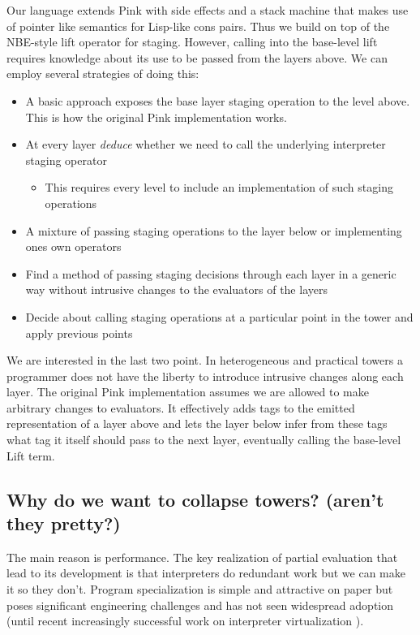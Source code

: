 \documentclass{article}
\begin{document}
Our language extends Pink with side effects and a stack machine that makes use of pointer like semantics for Lisp-like cons pairs. Thus we build on top of the NBE-style lift operator for staging. However, calling into
the base-level lift requires knowledge about its use to be passed from the layers above. We can employ several strategies of doing this:
\begin{itemize}
	\item A basic approach exposes the base layer staging operation to the level above. This is how the original Pink implementation works.
	\item At every layer \textit{deduce} whether we need to call the underlying interpreter staging operator
	\begin{itemize}
		\item This requires every level to include an implementation of such staging operations
	\end{itemize}
	\item A mixture of passing staging operations to the layer below or implementing ones own operators
	\item Find a method of passing staging decisions through each layer in a generic way without intrusive changes to the evaluators of the layers
	\item Decide about calling staging operations at a particular point in the tower and apply previous points
\end{itemize}
We are interested in the last two point. In heterogeneous and practical towers a programmer does not have the liberty to introduce intrusive changes along each layer.
The original Pink implementation assumes we are allowed to make arbitrary changes to evaluators. It effectively adds tags to the emitted representation of a layer above and lets the layer below infer from these tags
what tag it itself should pass to the next layer, eventually calling the base-level Lift term.

\subsection{Why do we want to collapse towers? (aren't they pretty?)}
The main reason is performance. The key realization of partial evaluation that lead to its development is that interpreters do redundant work but we can make it so they don't. Program specialization
is simple and attractive on paper but poses significant engineering challenges and has not seen widespread adoption (until recent increasingly successful work on interpreter virtualization \cite{wurthinger2013one}).
\end{document}
